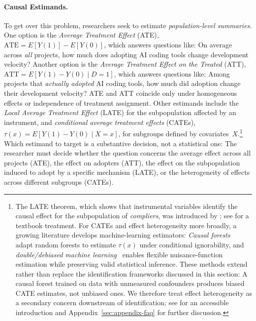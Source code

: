 \paragraph{Causal Estimands.}
To get over this problem, researchers seek to estimate \emph{population-level summaries}.
One option is the \emph{Average Treatment Effect} (ATE), $\text{ATE} = E[Y(1)] - E[Y(0)]$, which answers questions like: On average across \emph{all} projects, how much does adopting AI coding tools change development velocity?
Another option is the \emph{Average Treatment Effect on the Treated} (ATT), $\text{ATT} = E[Y(1) - Y(0) \mid D = 1]$, which answers questions like: Among projects that \emph{actually adopted} AI coding tools, how much did adoption change their development velocity?
ATE and ATT coincide only under homogeneous effects or independence of treatment assignment.
Other estimands include the \emph{Local Average Treatment Effect} (LATE) for the subpopulation affected by an instrument, and \emph{conditional average treatment effects} (CATEs), $\tau(x) = E[Y(1) - Y(0) \mid X = x]$, for subgroups defined by covariates~$X$.\footnote{The LATE theorem, which shows that instrumental variables identify the causal effect for the subpopulation of \emph{compliers}, was introduced by \citet{angrist1996identification}; see \citet[Ch.~4, \S4.4--4.5]{angrist2009mostly} for a textbook treatment.
For CATEs and effect heterogeneity more broadly, a growing literature develops machine-learning estimators: \emph{Causal forests}~\cite{athey2016recursive, wager2018estimation} adapt random forests to estimate $\tau(x)$ under conditional ignorability, and \emph{double/debiased machine learning}~\cite{chernozhukov2018double} enables flexible nuisance-function estimation while preserving valid statistical inference.
These methods extend rather than replace the identification frameworks discussed in this section: A causal forest trained on data with unmeasured confounders produces biased CATE estimates, not unbiased ones.
We therefore treat effect heterogeneity as a secondary concern downstream of identification; see \citet[Ch.~10]{huntingtonklein2021effect} for an accessible introduction and Appendix~\ref{sec:appendix-faq} for further discussion.}
Which estimand to target is a substantive decision, not a statistical one: The researcher must decide whether the question concerns the average effect across all projects (ATE), the effect on adopters (ATT), the effect on the subpopulation induced to adopt by a specific mechanism (LATE), or the heterogeneity of effects across different subgroups (CATEs).

